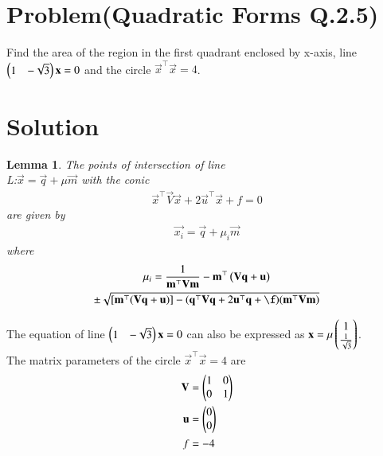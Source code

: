 \documentclass[journal,12pt,twocolumn]{IEEEtran}
\newtheorem{lemma}[theorem]{Lemma}
\begin{document}
\section{Problem(Quadratic Forms Q.2.5)}
Find the area of the region in the first quadrant enclosed by x-axis, line $\begin{pmatrix}1 & -\sqrt{3}\end{pmatrix}\mathbf{x}=0$ and the circle $\vec{x}^\top\vec{x}=4$.
\section{Solution}
\begin{lemma}
The points of intersection of line \\L:$\vec{x}=\vec{q}+\mu \vec{m}$ with the conic 
\begin{align}
\vec{x}^\top\vec{V}\vec{x}+2\vec{u}^\top\vec{x}+f=0
\end{align}
are given by 
\begin{align}  \vec{x_{i}}=\vec{q}+\mu_{i}\vec{m}
\end{align}
where 
\begin{multline}
    \mu_i=\frac{1}{\vec{m}^\top\vec{V}\vec{m}}-\vec{m}^\top\brak{\vec{V}\vec{q}+\vec{u}}\\ \pm\sqrt{[\vec{m}^\top(\vec{V}\vec{q}+\vec{u})]-(\vec{q}^\top\vec{V}\vec{q}+2\vec{u}^\top\vec{q}+\f)(\vec{m}^\top\vec{V}\vec{m})} 
\end{multline}

\end{lemma}
The equation of line $\begin{pmatrix}1 & -\sqrt{3}\end{pmatrix}\mathbf{x}=0$ can also be expressed as $\mathbf{x}=\mu \begin{pmatrix}1 \\ \frac{1}{\sqrt{3}}\end{pmatrix}$.\\
The matrix parameters of the circle $\vec{x}^\top\vec{x}=4$ are
\begin{align}
    \mathbf{V}&=\begin{pmatrix}1&0\\0&1\end{pmatrix}\\
    \mathbf{u}&=\begin{pmatrix}0\\0\end{pmatrix}\\
    f &= -4
\end{align}
\end{document}
